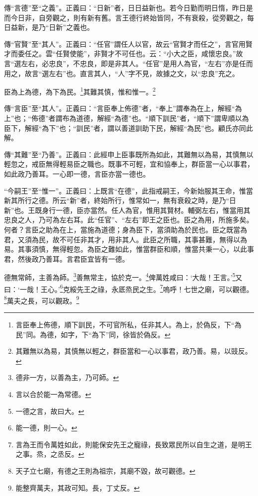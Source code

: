 {\noindent\zhuan{}\fzbyks 傳“言德”至“之義”。正義曰：“日新”者，日日益新也。若今日勤而明日惰，昨日是而今日非，自旁觀之，則有新有舊。言王德行終始皆同，不有衰殺，從旁觀之，每日益新，是乃“日新”之義也。 \par}

{\noindent\zhuan{}\fzbyks 傳“官賢”至“其人”。正義曰：“任官”謂任人以官，故云“官賢才而任之”，言官用賢才而委任之。雲“任賢使能”，非賢才不可任也。云：“小大之臣，咸懷忠良。”故言“選左右，必忠良”，不忠良，即是非其人。“任官”是用人為官，“左右”亦是任而用之，故言“選左右”也。直言其人，“人”字不見，故據之文，以“忠良”充之。 \par}

臣為上為德，為下為民。\footnote{言臣奉上佈德，順下訓民，不可官所私，任非其人。為上，於偽反，下“為民”同。為德，如字，下“為下”同，徐皆於偽反。}其難其慎，惟和惟一。\footnote{其難無以為易，其慎無以輕之，群臣當和一心以事君，政乃善。易，以豉反。}

{\noindent\zhuan{}\fzbyks 傳“言臣”至“其人”。正義曰：“言臣奉上佈德”者，“奉上”謂奉為在上，解經“為上”也；“佈德”者謂布為道德，解經“為德”也。“順下訓民”者，“順下”謂卑順以為臣下，解經“為下”也；“訓民”者，謂以善道訓助下民，解經“為民”也。顧氏亦同此解。 \par}

{\noindent\zhuan{}\fzbyks 傳“其難”至“乃善”。正義曰：此經申上臣事既所為如此，其難無以為易，其慎無以輕忽之，戒臣無得輕易臣之職也。既事不可輕，宜和協奉上，群臣當一心以事君，如此政乃善耳。一心即一德，言臣亦當一德也。 \par}

{\noindent\shu{}\fzkt “今嗣王”至“惟一”。正義曰：上既言“在德”，此指戒嗣王，今新始服其王命，惟當新其所行之德。所云“新”者，終始所行，惟常如一，無有衰殺之時，是乃“日新”也。王既身行一德，臣亦當然。任人為官，惟用其賢材。輔弼左右，惟當用其忠良之人，乃可為左右耳。此“任官”、“左右”即王之臣也。臣之為用，所施多矣。何者？言臣之助為在上，當施為道德；身為臣下，當須助為於民也。臣之既當為君，又須為民，故不可任非其才，用非其人。此臣之所職，其事甚難，無得以為易。其事須慎，無得輕忽。為臣之難如此，惟當群臣和順，惟當共秉一心，以此事君，然後政乃善耳。言君臣宜皆有一德。 \par}

德無常師，主善為師。\footnote{德非一方，以善為主，乃可師。}善無常主，協於克一。\footnote{言以合於能一為常德。}俾萬姓咸曰：‘大哉！王言。’\footnote{一德之言，故曰大。}又曰：‘一哉！王心。’\footnote{能一德，則一心。}克綏先王之祿，永厎烝民之生。\footnote{言為王而令萬姓如此，則能保安先王之寵祿，長致眾民所以自生之道，是明王之事。烝，之丞反。}嗚呼！七世之廟，可以觀德。\footnote{天子立七廟，有德之王則為祖宗，其廟不毀，故可觀德。}萬夫之長，可以觀政。\footnote{能整齊萬夫，其政可知。長，丁丈反。}


